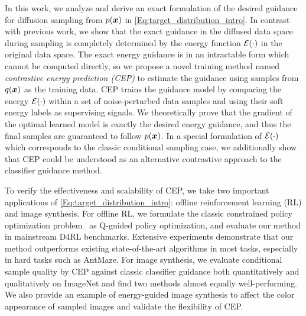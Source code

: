 In this work, we analyze and derive an exact formulation of the desired guidance for diffusion sampling from $p({\bm{x}})$ in \eqref{Eq:target_distribution_intro}. In contrast with previous work, we show that the exact guidance in the diffused data space during sampling is completely determined by the energy function ${\mathcal{E}}(\cdot)$ in the original data space. The exact energy guidance is in an intractable form which cannot be computed directly, so we propose a novel training method named \textit{contrastive energy prediction (CEP)} to estimate the guidance using samples from $q({\bm{x}})$ as the training data. 
CEP trains the guidance model by comparing the energy ${\mathcal{E}}(\cdot)$ within a set of noise-perturbed data samples and using their soft energy labels as supervising signals. 
We theoretically prove that the gradient of the optimal learned model is exactly the desired energy guidance, and thus the final samples are guaranteed to follow $p({\bm{x}})$. In a special formulation of ${\mathcal{E}}(\cdot)$ which corresponds to the classic conditional sampling case, we additionally show that CEP could be understood as an alternative contrastive approach to the classifier guidance method.













To verify the effectiveness and scalability of CEP, we take two important applications of \eqref{Eq:target_distribution_intro}: offline reinforcement learning (RL) and image synthesis.
For offline RL, we formulate the classic constrained policy optimization problem~\citep{rwr, awr} as Q-guided policy optimization, and evaluate our method in mainstream D4RL \citep{d4rl} benchmarks. Extensive experiments demonstrate that our method outperforms existing state-of-the-art algorithms in most tasks, especially in hard tasks such as AntMaze. For image synthesis, we evaluate conditional sample quality by CEP against classic classifier guidance \citep{diffusion_beat_gan} both quantitatively and qualitatively on ImageNet and find two methods almost equally well-performing. We also provide an example of energy-guided image synthesis to affect the color appearance of sampled images and validate the flexibility of CEP.





